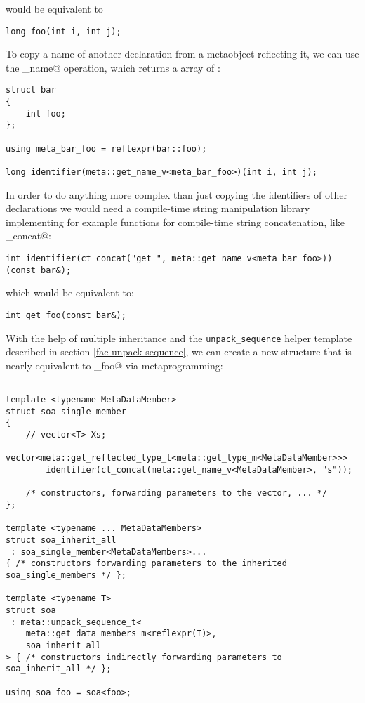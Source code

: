 would be equivalent to 

\begin{verbatim}
long foo(int i, int j);
\end{verbatim}

To copy a name of another declaration from a metaobject reflecting it,
we can use the \verb@get_name@ operation, which returns a \verb@constexpr@
array of \verb@char@s:

\begin{verbatim}
struct bar
{
	int foo;
};

using meta_bar_foo = reflexpr(bar::foo);

long identifier(meta::get_name_v<meta_bar_foo>)(int i, int j);
\end{verbatim}

In order to do anything more complex than just
copying the identifiers of other declarations we would need a compile-time
string manipulation library implementing for example functions for
compile-time string concatenation, like \verb@ct_concat@:

\begin{verbatim}
int identifier(ct_concat("get_", meta::get_name_v<meta_bar_foo>))(const bar&);
\end{verbatim}

which would be equivalent to:

\begin{verbatim}
int get_foo(const bar&);
\end{verbatim}

With the help of multiple inheritance and the
\hyperref[fac-unpack-sequence]{\texttt{unpack\_sequence}} helper template described
in section \ref{fac-unpack-sequence}, we can create a new structure that is
nearly equivalent to \verb@soa_foo@ via metaprogramming:

\begin{verbatim}

template <typename MetaDataMember>
struct soa_single_member
{
	// vector<T> Xs;
	vector<meta::get_reflected_type_t<meta::get_type_m<MetaDataMember>>>
		identifier(ct_concat(meta::get_name_v<MetaDataMember>, "s"));

	/* constructors, forwarding parameters to the vector, ... */
};

template <typename ... MetaDataMembers>
struct soa_inherit_all
 : soa_single_member<MetaDataMembers>...
{ /* constructors forwarding parameters to the inherited soa_single_members */ };

template <typename T>
struct soa
 : meta::unpack_sequence_t<
	meta::get_data_members_m<reflexpr(T)>,
	soa_inherit_all
> { /* constructors indirectly forwarding parameters to soa_inherit_all */ };

using soa_foo = soa<foo>;
\end{verbatim}


